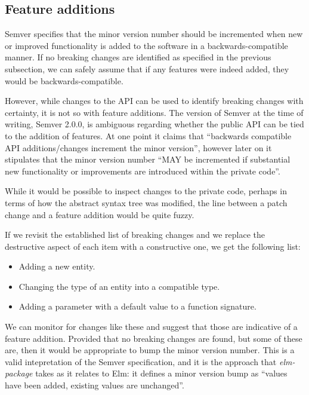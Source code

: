 \documentclass{l4proj}
\begin{document}
\subsection{Feature additions}

Semver specifies that the minor version number should be incremented
when new or improved functionality is added to the software in a
backwards-compatible manner. If no breaking changes are identified as
specified in the previous subsection, we can safely assume that if any
features were indeed added, they would be backwards-compatible.

However, while changes to the API can be used to identify breaking
changes with certainty, it is not so with feature additions. The
version of Semver at the time of writing, Semver 2.0.0, is ambiguous
regarding whether the public API can be tied to the addition of
features. At one point it claims that ``backwards compatible API
additions/changes increment the minor version'', however later on it
stipulates that the minor version number ``MAY be incremented if
substantial new functionality or improvements are introduced within
the private code''.

While it would be possible to inspect changes to the private code,
perhaps in terms of how the abstract syntax tree was modified, the
line between a patch change and a feature addition would be quite
fuzzy.

If we revisit the established list of breaking changes and we replace
the destructive aspect of each item with a constructive one, we get
the following list:

\begin{itemize}
\item Adding a new entity.
\item Changing the type of an entity into a compatible type.
\item Adding a parameter with a default value to a function signature.
\end{itemize}

We can monitor for changes like these and suggest that those are
indicative of a feature addition. Provided that no breaking changes
are found, but some of these are, then it would be appropriate to bump
the minor version number. This is a valid intepretation of the Semver
specification, and it is the approach that \textit{elm-package} takes
\cite{ElmPackageVR} as it relates to Elm: it defines a minor version
bump as ``values have been added, existing values are unchanged''.
\end{document}
